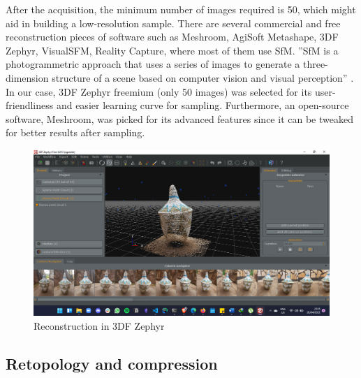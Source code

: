 \documentclass[conference]{IEEEtran}
\begin{document}
After the acquisition, the minimum number of images required is 50, which might aid in building a low-resolution sample. There are several commercial and free reconstruction pieces of software such as Meshroom, AgiSoft Metashape, 3DF Zephyr, VisualSFM, Reality Capture, where most of them use SfM. ”SfM is a photogrammetric approach that uses a series of images to generate a three-dimension structure of a scene based on computer vision and visual perception” \cite{Na2022}. In our case, 3DF Zephyr freemium (only 50 images) was selected for its user-friendliness and easier learning curve for sampling. Furthermore, an open-source software, Meshroom, was picked for its advanced features since it can be tweaked for better results after sampling.

\begin{figure}[!h]
    \centering
    \includegraphics[width=\linewidth]{images/3df.png}
    \caption{Reconstruction in 3DF Zephyr}
    \label{fig:one}
\end{figure}

\subsection{Retopology and compression}
\end{document}

